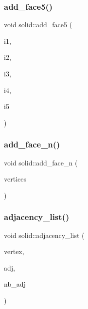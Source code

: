 \subsubsection{\texorpdfstring{add\+\_\+face5()}{add\_face5()}}
{\footnotesize\ttfamily void solid\+::add\+\_\+face5 (\begin{DoxyParamCaption}\item[{\mbox{\hyperlink{galois_8h_a09fddde158a3a20bd2dcadb609de11dc}{I\+NT}}}]{i1,  }\item[{\mbox{\hyperlink{galois_8h_a09fddde158a3a20bd2dcadb609de11dc}{I\+NT}}}]{i2,  }\item[{\mbox{\hyperlink{galois_8h_a09fddde158a3a20bd2dcadb609de11dc}{I\+NT}}}]{i3,  }\item[{\mbox{\hyperlink{galois_8h_a09fddde158a3a20bd2dcadb609de11dc}{I\+NT}}}]{i4,  }\item[{\mbox{\hyperlink{galois_8h_a09fddde158a3a20bd2dcadb609de11dc}{I\+NT}}}]{i5 }\end{DoxyParamCaption})}

\mbox{\label{classsolid_adbadfbdd46abe10cb56f041d2408b001}} 
\subsubsection{\texorpdfstring{add\+\_\+face\+\_\+n()}{add\_face\_n()}}
{\footnotesize\ttfamily void solid\+::add\+\_\+face\+\_\+n (\begin{DoxyParamCaption}\item[{\mbox{\hyperlink{class_vector}{Vector}} \&}]{vertices }\end{DoxyParamCaption})}

\mbox{\label{classsolid_af0ad596c4fd4b091118dd0d6e3e3bf67}} 
\subsubsection{\texorpdfstring{adjacency\+\_\+list()}{adjacency\_list()}}
{\footnotesize\ttfamily void solid\+::adjacency\+\_\+list (\begin{DoxyParamCaption}\item[{\mbox{\hyperlink{galois_8h_a09fddde158a3a20bd2dcadb609de11dc}{I\+NT}}}]{vertex,  }\item[{\mbox{\hyperlink{galois_8h_a09fddde158a3a20bd2dcadb609de11dc}{I\+NT}} $\ast$}]{adj,  }\item[{\mbox{\hyperlink{galois_8h_a09fddde158a3a20bd2dcadb609de11dc}{I\+NT}} $\ast$}]{nb\+\_\+adj }\end{DoxyParamCaption})}

